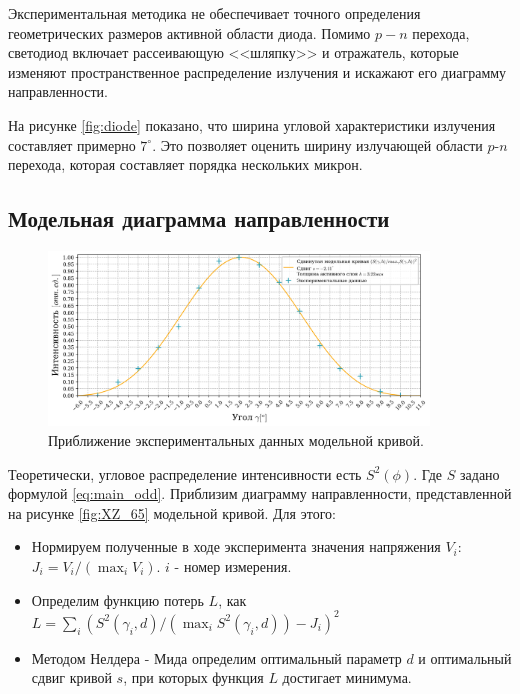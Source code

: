 \documentclass[a4paper, 12pt]{extarticle}
\begin{document}
Экспериментальная методика не обеспечивает точного определения геометрических размеров активной области диода. Помимо $p-n$ перехода, светодиод включает рассеивающую <<шляпку>> и отражатель, которые изменяют пространственное распределение излучения и искажают его диаграмму направленности.


На рисунке \ref{fig:diode} показано, что ширина угловой характеристики излучения составляет примерно \(7^\circ\). Это позволяет оценить ширину излучающей области $p$-$n$ перехода, которая составляет порядка нескольких микрон.


\subsection*{\textcolor{sub_header}{Модельная диаграмма направленности}}

\begin{figure}[htbp]
    \centering
    \includegraphics[width = 0.9\textwidth]{pics/model.png}
    \caption{Приближение экспериментальных данных модельной кривой.}
    \label{fig:model}
\end{figure}

Теоретически, угловое распределение интенсивности есть $S^{2}(\phi)$. Где $S$ задано формулой \ref{eq:main_odd}. Приблизим диаграмму направленности, представленной на рисунке \ref{fig:XZ_65} модельной кривой. Для этого:
\begin{itemize}
    \item Нормируем полученные в ходе эксперимента значения напряжения $V_i$: $J_i = V_i / (\max_i V_i)$. $i$ - номер измерения.
    \item Определим функцию потерь $L$, как $L = \sum_i (S^{2}(\gamma_i, d) / (\max_{i} S^{2}(\gamma_i, d)) - J_i)^{2}$ 
    \item Методом Нелдера - Мида определим оптимальный параметр $d$ и оптимальный сдвиг кривой $s$, при которых функция $L$ достигает минимума.
\end{itemize}
\end{document}
